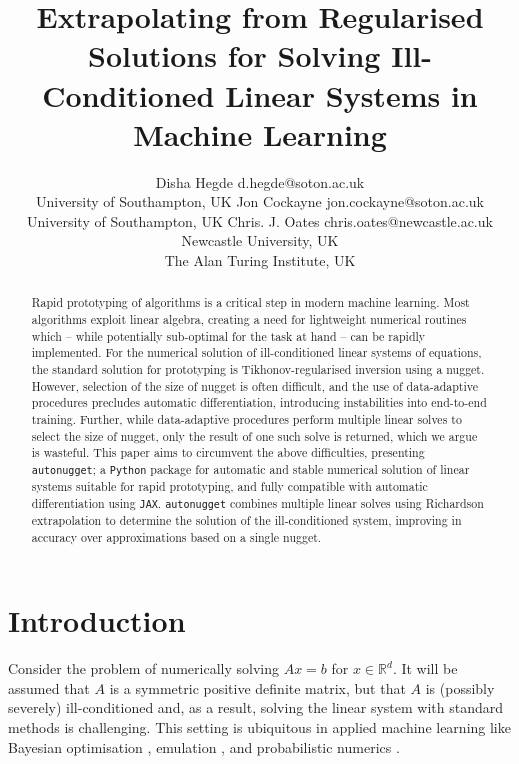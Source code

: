 \documentclass[10pt]{article} %
\title{Extrapolating from Regularised Solutions for Solving Ill-Conditioned Linear Systems in Machine Learning}
\author{\name Disha Hegde \email d.hegde@soton.ac.uk \\
      \addr University of Southampton, UK
      \AND
      \name Jon Cockayne \email jon.cockayne@soton.ac.uk \\
      \addr University of Southampton, UK
      \AND
      \name Chris. J. Oates \email chris.oates@newcastle.ac.uk\\
      \addr Newcastle University, UK \\ The Alan Turing Institute, UK}
\begin{document}
\maketitle

\begin{abstract}
Rapid prototyping of algorithms is a critical step in modern machine learning.
Most algorithms exploit linear algebra, creating a need for lightweight numerical routines which -- while potentially sub-optimal for the task at hand -- can be rapidly implemented.
For the numerical solution of ill-conditioned linear systems of equations, the standard solution for prototyping is Tikhonov-regularised inversion using a nugget.
However, selection of the size of nugget is often difficult, and the use of data-adaptive procedures precludes automatic differentiation, introducing instabilities into end-to-end training.
Further, while data-adaptive procedures perform multiple linear solves to select the size of nugget, only the result of one such solve is returned, which we argue is wasteful.
This paper aims to circumvent the above difficulties, presenting \texttt{autonugget}; a \texttt{Python} package for automatic and stable numerical solution of linear systems suitable for rapid prototyping, and fully compatible with automatic differentiation using \texttt{JAX}.
\texttt{autonugget} combines multiple linear solves using Richardson extrapolation to determine the solution of the ill-conditioned system, improving in accuracy over approximations based on a single nugget.



\end{abstract}

\section{Introduction} \label{sec: introduction}
Consider the problem of numerically solving $A x = b$ for $x \in \mathbb{R}^d$.
It will be assumed that $A$ is a symmetric positive definite matrix, but that $A$ is (possibly severely) ill-conditioned and, as a result, solving the linear system with standard methods is challenging.
This setting is ubiquitous in applied machine learning like Bayesian optimisation \citep{garnett_bayesoptbook_2023}, emulation \citep{gramacy_surrogates_nodate}, and probabilistic numerics \citep{hennig_probabilistic_2022}. 
\end{document}

